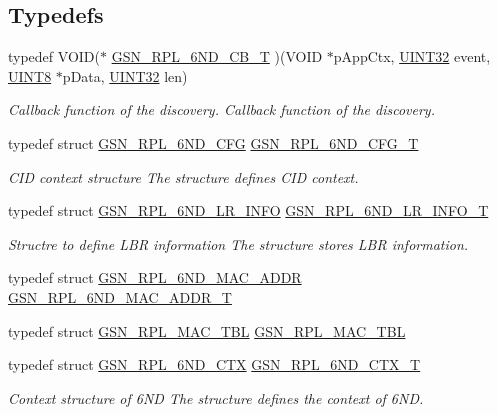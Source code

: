 \subsection*{Typedefs}
\begin{DoxyCompactItemize}
\item 
typedef VOID($\ast$ \hyperlink{a00473_a746a04234ff43643fc1948ada254379c}{GSN\_\-RPL\_\-6ND\_\-CB\_\-T} )(VOID $\ast$pAppCtx, \hyperlink{a00660_gae1e6edbbc26d6fbc71a90190d0266018}{UINT32} event, \hyperlink{a00660_gab27e9918b538ce9d8ca692479b375b6a}{UINT8} $\ast$pData, \hyperlink{a00660_gae1e6edbbc26d6fbc71a90190d0266018}{UINT32} len)
\begin{DoxyCompactList}\small\item\em Callback function of the discovery. Callback function of the discovery. \end{DoxyCompactList}\item 
typedef struct \hyperlink{a00193}{GSN\_\-RPL\_\-6ND\_\-CFG} \hyperlink{a00473_ae351fbf6827da8b8fd0868f9d5c54824}{GSN\_\-RPL\_\-6ND\_\-CFG\_\-T}
\begin{DoxyCompactList}\small\item\em CID context structure The structure defines CID context. \end{DoxyCompactList}\item 
typedef struct \hyperlink{a00195}{GSN\_\-RPL\_\-6ND\_\-LR\_\-INFO} \hyperlink{a00473_ae43655f56bf62bb2377a1a61dce9aa8d}{GSN\_\-RPL\_\-6ND\_\-LR\_\-INFO\_\-T}
\begin{DoxyCompactList}\small\item\em Structre to define LBR information The structure stores LBR information. \end{DoxyCompactList}\item 
typedef struct \hyperlink{a00196}{GSN\_\-RPL\_\-6ND\_\-MAC\_\-ADDR} \hyperlink{a00473_a6497e887e46b1689bb6fb78c1cb3da52}{GSN\_\-RPL\_\-6ND\_\-MAC\_\-ADDR\_\-T}
\item 
typedef struct \hyperlink{a00204}{GSN\_\-RPL\_\-MAC\_\-TBL} \hyperlink{a00473_a6b20f666b7a568c4fdcace0a0020b246}{GSN\_\-RPL\_\-MAC\_\-TBL}
\item 
typedef struct \hyperlink{a00194}{GSN\_\-RPL\_\-6ND\_\-CTX} \hyperlink{a00473_a92caa5dd3cd354266378c3d7178a3423}{GSN\_\-RPL\_\-6ND\_\-CTX\_\-T}
\begin{DoxyCompactList}\small\item\em Context structure of 6ND The structure defines the context of 6ND. \end{DoxyCompactList}\end{DoxyCompactItemize}
